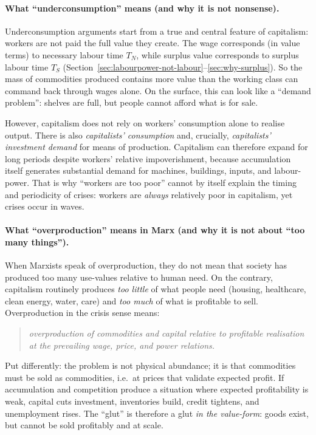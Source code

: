 \paragraph{What “underconsumption” means (and why it is not nonsense).}
Underconsumption arguments start from a true and central feature of capitalism:
workers are not paid the full value they create.
The wage corresponds (in value terms) to necessary labour time $T_N$, while surplus value
corresponds to surplus labour time $T_S$ (Section~\ref{sec:labourpower-not-labour}--\ref{sec:why-surplus}).
So the mass of commodities produced contains more value than the working class can
command back through wages alone.
On the surface, this can look like a “demand problem”: shelves are full, but people cannot
afford what is for sale.

However, capitalism does not rely on workers’ consumption alone to realise output.
There is also \emph{capitalists’ consumption} and, crucially, \emph{capitalists’ investment demand}
for means of production.
Capitalism can therefore expand for long periods despite workers' relative impoverishment,
because accumulation itself generates substantial demand for machines, buildings, inputs,
and labour-power.
That is why “workers are too poor” cannot by itself explain the timing and periodicity of
crises: workers are \emph{always} relatively poor in capitalism, yet crises occur in waves.

\paragraph{What “overproduction” means in Marx (and why it is not about “too many things”).}
When Marxists speak of overproduction, they do not mean that society has produced too
many use-values relative to human need.
On the contrary, capitalism routinely produces \emph{too little} of what people need (housing,
healthcare, clean energy, water, care) and \emph{too much} of what is profitable to sell.
Overproduction in the crisis sense means:
\begin{quote}
\emph{overproduction of commodities and capital relative to profitable realisation at the
prevailing wage, price, and power relations.}
\end{quote}
Put differently: the problem is not physical abundance; it is that commodities must be sold
as commodities, i.e.\ at prices that validate expected profit.
If accumulation and competition produce a situation where expected profitability is weak,
capital cuts investment, inventories build, credit tightens, and unemployment rises.
The “glut” is therefore a glut \emph{in the value-form}: goods exist, but cannot be sold
profitably and at scale.

